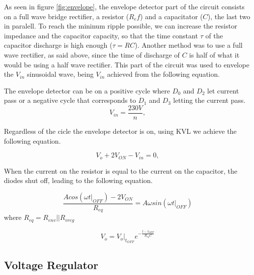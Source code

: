 As seen in figure \ref{fig:envelope}, the envelope detector part of the circuit consists on a full wave bridge rectifier, a resistor ($R_ef$) and a capacitator ($C$), the last two in paralell. To reach the mininum ripple possible, we can increase the resistor impedance and the capacitor capacity, so that the time constant $\tau$ of the capacitor discharge is high enough ($\tau=RC$). Another method was to use a full wave rectifier, as said above, since the time of discharge of $C$ is half of what it would be using a half wave rectifier. This part of the circuit was used to envelope the $V_{in}$ sinusoidal wave, being $V_{in}$ achieved from the following equation.

The envelope detector can be on a positive cycle where $D_0$ and $D_2$ let current pass or a negative cycle that corresponds to $D_1$ and $D_3$ letting the current pass.
\begin{equation}
  V_{in} = \frac{230V}{n},
  \label{eq:vin}
\end{equation}
 
Regardless of the cicle the envelope detector is on, using KVL we achieve the following equation.

\begin{equation}
    V_o + 2V_{ON} - V_{in} = 0,
 \label{eq:envelope2}  
\end{equation}

When the current on the resistor is equal to the current on the capacitor, the diodes shut off, leading to the following equation.


\begin{equation}
    \frac{Acos(\omega t|_{OFF})-2V_{ON}}{R_{eq}}=A\omega sin(\omega t|_{OFF})
\end{equation}
where $R_{eq}=R_{env}||R_{vreg}$

\begin{equation}
    V_o=V_o|_{t_{OFF}}e^{-\frac{t-t_{OFF}}{R_{eq}C}}
\end{equation}


\subsection{Voltage Regulator}
\label{sec:regulator}

